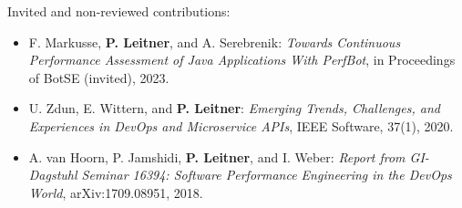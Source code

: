 \documentclass[a4paper,11pt]{article}
\begin{document}
\medskip\noindent Invited and non-reviewed contributions:
\begin{itemize}[itemsep=0.2em]
\item F. Markusse, \textbf{P. Leitner}, and A. Serebrenik: \emph{Towards Continuous Performance Assessment of Java Applications With PerfBot}, in Proceedings of BotSE (invited), 2023.
\item U. Zdun, E. Wittern, and \textbf{P. Leitner}: \emph{Emerging Trends, Challenges, and Experiences in DevOps and Microservice APIs}, IEEE Software, 37(1), 2020.
\item A. van Hoorn, P. Jamshidi, \textbf{P. Leitner}, and I. Weber: \emph{Report from GI-Dagstuhl Seminar 16394: Software Performance Engineering in the DevOps World}, arXiv:1709.08951, 2018.
\end{itemize}
\end{document}
